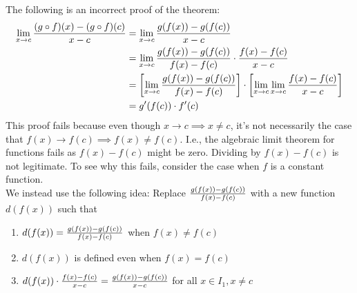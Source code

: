 \begin{info}
    The following is an incorrect proof of the theorem:
    \begin{align*}
        \lim \limits_{x \to c} \frac{(g\circ f)(x) - (g\circ f)(c)}{x-c} &= \lim \limits_{x \to c} \frac{g(f(x)) - g(f(c))}{x - c} \\
        &= \lim \limits_{x \to c} \frac{g(f(x)) - g(f(c))}{f(x) - f(c)} \cdot \frac{f(x) - f(c)}{x - c} \\ 
        &= \left[\lim \limits_{x \to c} \frac{g(f(x)) - g(f(c))}{f(x) - f(c)} \right] \cdot \left[\lim \limits_{x \to c} \lim \limits_{x \to c} \frac{f(x) - f(c)}{x-c} \right] \\
        &= g'(f(c)) \cdot f'(c)
    \end{align*}
    This proof fails because even though  $x \to c \implies x \not = c$, it's not necessarily the case that $f(x) \to f(c) \implies f(x) \not = f(c)$. I.e., the algebraic limit theorem for functions fails as $f(x) - f(c)$ might be zero. Dividing by $f(x) - f(c)$ is not legitimate. To see why this fails, consider the case when $f$ is a constant function. \\
    We instead use the following idea:
    Replace $\frac{g(f(x)) - g(f(c))}{f(x) - f(c)}$ with a new function $d(f(x))$ such that
    \begin{enumerate}[$(i)$]
        \item $d(f(x)) = \frac{g(f(x)) - g(f(c))}{f(x) - f(c)}$ when $f(x) \not = f(c)$
        \item $d(f(x))$ is defined even when $f(x) = f(c)$
        \item $d(f(x)) \cdot \frac{f(x) - f(c)}{x - c} = \frac{g(f(x)) - g(f(c))}{x - c}$ for all $x \in I_1, x \not = c$
    \end{enumerate}
\end{info}

